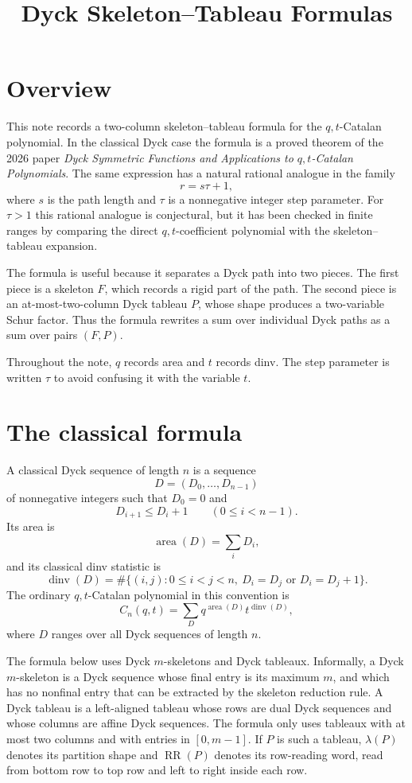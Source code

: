 \documentclass{article}
\title{Dyck Skeleton--Tableau Formulas}
\author{}
\date{}
\DeclareMathOperator{\area}{area}
\DeclareMathOperator{\dinv}{dinv}
\DeclareMathOperator{\RR}{RR}
\begin{document}
\maketitle

\section{Overview}

This note records a two-column skeleton--tableau formula for the
\(q,t\)-Catalan polynomial.  In the classical Dyck case the formula is a
proved theorem of the 2026 paper \emph{Dyck Symmetric Functions and
Applications to \(q,t\)-Catalan Polynomials}.  The same expression has a
natural rational analogue in the family
\[
  r=s\tau+1,
\]
where \(s\) is the path length and \(\tau\) is a nonnegative integer step
parameter.  For \(\tau>1\) this rational analogue is conjectural, but it has
been checked in finite ranges by comparing the direct \(q,t\)-coefficient
polynomial with the skeleton--tableau expansion.

The formula is useful because it separates a Dyck path into two pieces.  The
first piece is a skeleton \(F\), which records a rigid part of the path.  The
second piece is an at-most-two-column Dyck tableau \(P\), whose shape produces
a two-variable Schur factor.  Thus the formula rewrites a sum over individual
Dyck paths as a sum over pairs \((F,P)\).

Throughout the note, \(q\) records area and \(t\) records dinv.  The step
parameter is written \(\tau\) to avoid confusing it with the variable \(t\).

\section{The classical formula}

A classical Dyck sequence of length \(n\) is a sequence
\[
  D=(D_0,\ldots,D_{n-1})
\]
of nonnegative integers such that \(D_0=0\) and
\[
  D_{i+1}\le D_i+1
  \qquad(0\le i<n-1).
\]
Its area is
\[
  \area(D)=\sum_i D_i,
\]
and its classical dinv statistic is
\[
  \dinv(D)=\#\{(i,j):0\le i<j<n,
      \ D_i=D_j\text{ or }D_i=D_j+1\}.
\]
The ordinary \(q,t\)-Catalan polynomial in this convention is
\[
  C_n(q,t)=\sum_D q^{\area(D)}t^{\dinv(D)},
\]
where \(D\) ranges over all Dyck sequences of length \(n\).

The formula below uses Dyck \(m\)-skeletons and Dyck tableaux.  Informally, a
Dyck \(m\)-skeleton is a Dyck sequence whose final entry is its maximum
\(m\), and which has no nonfinal entry that can be extracted by the skeleton
reduction rule.  A Dyck tableau is a left-aligned tableau whose rows are dual
Dyck sequences and whose columns are affine Dyck sequences.  The formula only
uses tableaux with at most two columns and with entries in \([0,m-1]\).  If
\(P\) is such a tableau, \(\lambda(P)\) denotes its partition shape and
\(\RR(P)\) denotes its row-reading word, read from bottom row to top row and
left to right inside each row.
\end{document}
